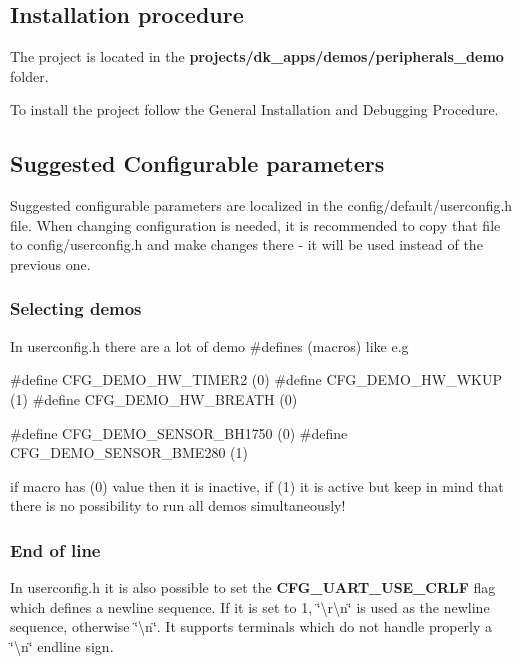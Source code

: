 \subsection*{Installation procedure}

The project is located in the {\bfseries {\ttfamily projects/dk\+\_\+apps/demos/peripherals\+\_\+demo}} folder.

To install the project follow the General Installation and Debugging Procedure.

\subsection*{Suggested Configurable parameters}

Suggested configurable parameters are localized in the {\ttfamily config/default/userconfig.\+h} file. When changing configuration is needed, it is recommended to copy that file to {\ttfamily config/userconfig.\+h} and make changes there -\/ it will be used instead of the previous one.

\subsubsection*{Selecting demos}

In {\ttfamily userconfig.\+h} there are a lot of demo \#defines (macros) like e.\+g 
\begin{DoxyCode}
\textcolor{preprocessor}{#define CFG\_DEMO\_HW\_TIMER2      (0)}
\textcolor{preprocessor}{#define CFG\_DEMO\_HW\_WKUP        (1)}
\textcolor{preprocessor}{#define CFG\_DEMO\_HW\_BREATH      (0)}
\end{DoxyCode}
 
\begin{DoxyCode}
\textcolor{preprocessor}{#define CFG\_DEMO\_SENSOR\_BH1750  (0)}
\textcolor{preprocessor}{#define CFG\_DEMO\_SENSOR\_BME280  (1)}
\end{DoxyCode}
 if macro has (0) value then it is inactive, if (1) it is active but keep in mind that there is no possibility to run all demos simultaneously!

\subsubsection*{End of line}

In {\ttfamily userconfig.\+h} it is also possible to set the {\bfseries C\+F\+G\+\_\+\+U\+A\+R\+T\+\_\+\+U\+S\+E\+\_\+\+C\+R\+L\+F} flag which defines a newline sequence. If it is set to 1, \char`\"{}\textbackslash{}r\textbackslash{}n\char`\"{} is used as the newline sequence, otherwise \char`\"{}\textbackslash{}n\char`\"{}. It supports terminals which do not handle properly a \char`\"{}\textbackslash{}n\char`\"{} endline sign.

